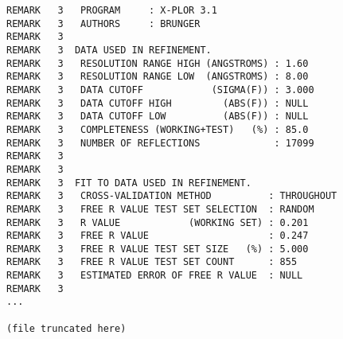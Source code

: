 \begin{lstlisting}
REMARK   3   PROGRAM     : X-PLOR 3.1                                           
REMARK   3   AUTHORS     : BRUNGER                                              
REMARK   3                                                                      
REMARK   3  DATA USED IN REFINEMENT.                                            
REMARK   3   RESOLUTION RANGE HIGH (ANGSTROMS) : 1.60                           
REMARK   3   RESOLUTION RANGE LOW  (ANGSTROMS) : 8.00                           
REMARK   3   DATA CUTOFF            (SIGMA(F)) : 3.000                          
REMARK   3   DATA CUTOFF HIGH         (ABS(F)) : NULL                           
REMARK   3   DATA CUTOFF LOW          (ABS(F)) : NULL                           
REMARK   3   COMPLETENESS (WORKING+TEST)   (%) : 85.0                           
REMARK   3   NUMBER OF REFLECTIONS             : 17099                          
REMARK   3                                                                      
REMARK   3                                                                      
REMARK   3  FIT TO DATA USED IN REFINEMENT.                                     
REMARK   3   CROSS-VALIDATION METHOD          : THROUGHOUT                      
REMARK   3   FREE R VALUE TEST SET SELECTION  : RANDOM                          
REMARK   3   R VALUE            (WORKING SET) : 0.201                           
REMARK   3   FREE R VALUE                     : 0.247                           
REMARK   3   FREE R VALUE TEST SET SIZE   (%) : 5.000                           
REMARK   3   FREE R VALUE TEST SET COUNT      : 855                             
REMARK   3   ESTIMATED ERROR OF FREE R VALUE  : NULL                            
REMARK   3                                                                      
... 

(file truncated here)



\end{lstlisting}
